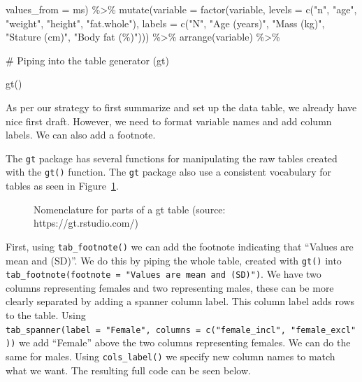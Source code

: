 \documentclass[
  11pt,
  letterpaper,
]{scrbook}
\newenvironment{Shaded}{\begin{snugshade}}{\end{snugshade}}
\newcommand{\AttributeTok}[1]{\textcolor[rgb]{0.40,0.45,0.13}{#1}}
\newcommand{\CommentTok}[1]{\textcolor[rgb]{0.37,0.37,0.37}{#1}}
\newcommand{\FunctionTok}[1]{\textcolor[rgb]{0.28,0.35,0.67}{#1}}
\newcommand{\NormalTok}[1]{\textcolor[rgb]{0.00,0.23,0.31}{#1}}
\newcommand{\SpecialCharTok}[1]{\textcolor[rgb]{0.37,0.37,0.37}{#1}}
\newcommand{\StringTok}[1]{\textcolor[rgb]{0.13,0.47,0.30}{#1}}
\begin{document}
\begin{Shaded}
\begin{Highlighting}[numbers=left,,]
              \AttributeTok{values\_from =}\NormalTok{ ms) }\SpecialCharTok{\%\textgreater{}\%}
    \FunctionTok{mutate}\NormalTok{(}\AttributeTok{variable =} \FunctionTok{factor}\NormalTok{(variable, }\AttributeTok{levels =} \FunctionTok{c}\NormalTok{(}\StringTok{"n"}\NormalTok{, }\StringTok{"age"}\NormalTok{, }\StringTok{"weight"}\NormalTok{, }\StringTok{"height"}\NormalTok{, }\StringTok{"fat.whole"}\NormalTok{), }
                           \AttributeTok{labels =} \FunctionTok{c}\NormalTok{(}\StringTok{"N"}\NormalTok{, }\StringTok{"Age (years)"}\NormalTok{, }\StringTok{"Mass (kg)"}\NormalTok{, }
                                      \StringTok{"Stature (cm)"}\NormalTok{, }\StringTok{"Body fat (\%)"}\NormalTok{))) }\SpecialCharTok{\%\textgreater{}\%}
  \FunctionTok{arrange}\NormalTok{(variable) }\SpecialCharTok{\%\textgreater{}\%}
  
  \CommentTok{\# Piping into the table generator (gt)}

  \FunctionTok{gt}\NormalTok{()  }
\end{Highlighting}
\end{Shaded}

As per our strategy to first summarize and set up the data table, we
already have nice first draft. However, we need to format variable names
and add column labels. We can also add a footnote.

The \texttt{gt} package has several functions for manipulating the raw
tables created with the \texttt{gt()} function. The \texttt{gt} package
also use a consistent vocabulary for tables as seen in
Figure~\ref{fig-gt-parts}.

\begin{figure}

{\centering 

}

\caption{\label{fig-gt-parts}Nomenclature for parts of a gt table
(source: https://gt.rstudio.com/)}

\end{figure}

First, using \texttt{tab\_footnote()} we can add the footnote indicating
that ``Values are mean and (SD)''. We do this by piping the whole table,
created with \texttt{gt()} into
\texttt{tab\_footnote(footnote\ =\ "Values\ are\ mean\ and\ (SD)")}. We
have two columns representing females and two representing males, these
can be more clearly separated by adding a spanner column label. This
column label adds rows to the table. Using
\texttt{tab\_spanner(label\ =\ "Female",\ columns\ =\ c("female\_incl",\ "female\_excl"))}
we add ``Female'' above the two columns representing females. We can do
the same for males. Using \texttt{cols\_label()} we specify new column
names to match what we want. The resulting full code can be seen below.
\end{document}
